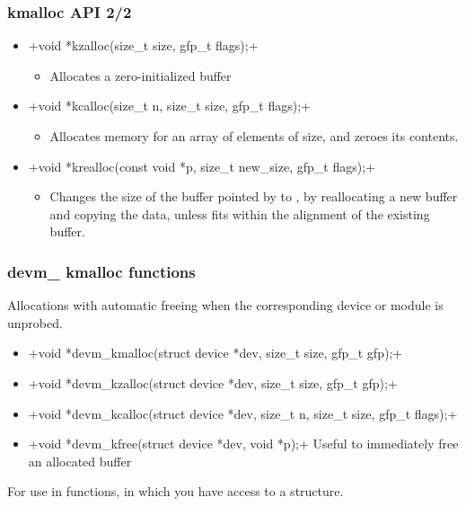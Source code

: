 \begin{frame}[fragile]
  \frametitle{kmalloc API 2/2}
  \begin{itemize}
  \item {}+void *kzalloc(size_t size, gfp_t flags);+
    \begin{itemize}
    \item Allocates a zero-initialized buffer
    \end{itemize}
  \item {}+void *kcalloc(size_t n, size_t size, gfp_t flags);+
    \begin{itemize}
    \item Allocates memory for an array of  elements of
       size, and zeroes its contents.
    \end{itemize}
  \item {}+void *krealloc(const void *p, size_t new_size, gfp_t flags);+
    \begin{itemize}
    \item Changes the size of the buffer pointed by  to
      , by reallocating a new buffer and copying the
      data, unless  fits within the alignment of
      the existing buffer.
    \end{itemize}
  \end{itemize}
\end{frame}

\begin{frame}
  \frametitle{devm\_ kmalloc functions}
  Allocations with automatic freeing when the corresponding device or module is unprobed.
  \begin{itemize}
  \small
  \item {}+void *devm_kmalloc(struct device *dev, size_t size, gfp_t gfp);+
  \item {}+void *devm_kzalloc(struct device *dev, size_t size, gfp_t gfp);+
  \item {}+void *devm_kcalloc(struct device *dev, size_t n, size_t size, gfp_t flags);+
  \item {}+void *devm_kfree(struct device *dev, void *p);+
        Useful to immediately free an allocated buffer
  \end{itemize}
  \normalsize
  For use in  functions, in which you have access to a
   structure.
\end{frame}

